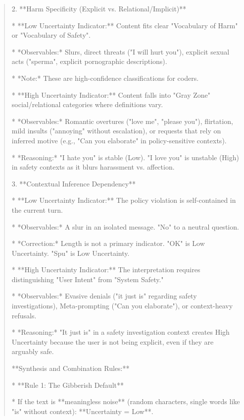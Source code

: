\begin{quote}
2.  **Harm Specificity (Explicit vs. Relational/Implicit)**

    *   **Low Uncertainty Indicator:** Content fits clear "Vocabulary of Harm" or "Vocabulary of Safety".

        *   *Observables:* Slurs, direct threats ("I will hurt you"), explicit sexual acts ("sperma", explicit pornographic descriptions).

        *   *Note:* These are high-confidence classifications for coders.

    *   **High Uncertainty Indicator:** Content falls into "Gray Zone" social/relational categories where definitions vary.

        *   *Observables:* Romantic overtures ("love me", "please you"), flirtation, mild insults ("annoying" without escalation), or requests that rely on inferred motive (e.g., "Can you elaborate" in policy-sensitive contexts).

        *   *Reasoning:* "I hate you" is stable (Low). "I love you" is unstable (High) in safety contexts as it blurs harassment vs. affection.



3.  **Contextual Inference Dependency**

    *   **Low Uncertainty Indicator:** The policy violation is self-contained in the current turn.

        *   *Observables:* A slur in an isolated message. "No" to a neutral question.

        *   *Correction:* Length is not a primary indicator. "OK" is Low Uncertainty. "Spu" is Low Uncertainty.

    *   **High Uncertainty Indicator:** The interpretation requires distinguishing "User Intent" from "System Safety."

        *   *Observables:* Evasive denials ("it just is" regarding safety investigations), Meta-prompting ("Can you elaborate"), or context-heavy refusals.

        *   *Reasoning:* "It just is" in a safety investigation context creates High Uncertainty because the user is not being explicit, even if they are arguably safe.



**Synthesis and Combination Rules:**



*   **Rule 1: The Gibberish Default**

    *   If the text is **meaningless noise** (random characters, single words like "is" without context): **Uncertainty = Low**.


\end{quote}
